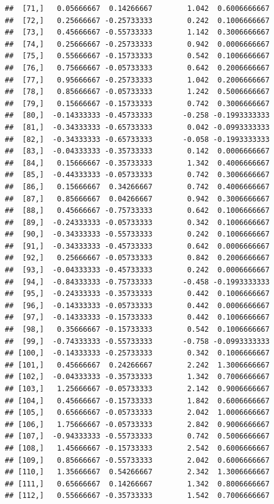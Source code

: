 \documentclass[]{book}
\theoremstyle{definition}
\theoremstyle{definition}
\theoremstyle{definition}
\theoremstyle{remark}
\begin{document}
\begin{verbatim}
##  [71,]   0.05666667  0.14266667        1.042  0.6006666667
##  [72,]   0.25666667 -0.25733333        0.242  0.1006666667
##  [73,]   0.45666667 -0.55733333        1.142  0.3006666667
##  [74,]   0.25666667 -0.25733333        0.942  0.0006666667
##  [75,]   0.55666667 -0.15733333        0.542  0.1006666667
##  [76,]   0.75666667 -0.05733333        0.642  0.2006666667
##  [77,]   0.95666667 -0.25733333        1.042  0.2006666667
##  [78,]   0.85666667 -0.05733333        1.242  0.5006666667
##  [79,]   0.15666667 -0.15733333        0.742  0.3006666667
##  [80,]  -0.14333333 -0.45733333       -0.258 -0.1993333333
##  [81,]  -0.34333333 -0.65733333        0.042 -0.0993333333
##  [82,]  -0.34333333 -0.65733333       -0.058 -0.1993333333
##  [83,]  -0.04333333 -0.35733333        0.142  0.0006666667
##  [84,]   0.15666667 -0.35733333        1.342  0.4006666667
##  [85,]  -0.44333333 -0.05733333        0.742  0.3006666667
##  [86,]   0.15666667  0.34266667        0.742  0.4006666667
##  [87,]   0.85666667  0.04266667        0.942  0.3006666667
##  [88,]   0.45666667 -0.75733333        0.642  0.1006666667
##  [89,]  -0.24333333 -0.05733333        0.342  0.1006666667
##  [90,]  -0.34333333 -0.55733333        0.242  0.1006666667
##  [91,]  -0.34333333 -0.45733333        0.642  0.0006666667
##  [92,]   0.25666667 -0.05733333        0.842  0.2006666667
##  [93,]  -0.04333333 -0.45733333        0.242  0.0006666667
##  [94,]  -0.84333333 -0.75733333       -0.458 -0.1993333333
##  [95,]  -0.24333333 -0.35733333        0.442  0.1006666667
##  [96,]  -0.14333333 -0.05733333        0.442  0.0006666667
##  [97,]  -0.14333333 -0.15733333        0.442  0.1006666667
##  [98,]   0.35666667 -0.15733333        0.542  0.1006666667
##  [99,]  -0.74333333 -0.55733333       -0.758 -0.0993333333
## [100,]  -0.14333333 -0.25733333        0.342  0.1006666667
## [101,]   0.45666667  0.24266667        2.242  1.3006666667
## [102,]  -0.04333333 -0.35733333        1.342  0.7006666667
## [103,]   1.25666667 -0.05733333        2.142  0.9006666667
## [104,]   0.45666667 -0.15733333        1.842  0.6006666667
## [105,]   0.65666667 -0.05733333        2.042  1.0006666667
## [106,]   1.75666667 -0.05733333        2.842  0.9006666667
## [107,]  -0.94333333 -0.55733333        0.742  0.5006666667
## [108,]   1.45666667 -0.15733333        2.542  0.6006666667
## [109,]   0.85666667 -0.55733333        2.042  0.6006666667
## [110,]   1.35666667  0.54266667        2.342  1.3006666667
## [111,]   0.65666667  0.14266667        1.342  0.8006666667
## [112,]   0.55666667 -0.35733333        1.542  0.7006666667

\end{verbatim}
\end{document}
